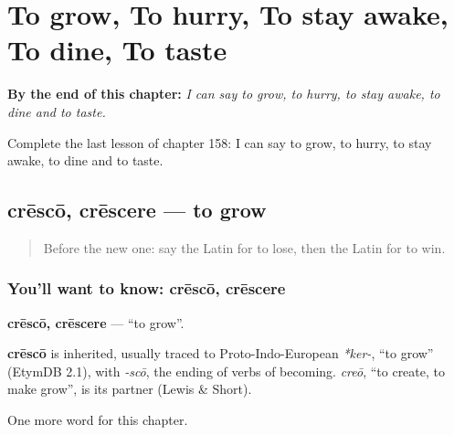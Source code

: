 
\chapter{To grow, To hurry, To stay awake, To dine, To taste}
\label{ch:la-to-grow-to-hurry-to-stay-awake-to-dine-to-taste}

\begin{chapteropening}
\textbf{By the end of this chapter:} \emph{I can say to grow, to hurry, to stay awake, to dine and to taste.}

Complete the last lesson of chapter 158: I can say to grow, to hurry, to stay awake, to dine and to taste.
\end{chapteropening}

\section[crēscō, crēscere]{crēscō, crēscere — to grow}

\label{lesson:LA-C158-cresco}



\begin{quote}
Before the new one: say the Latin for to lose, then the Latin for to win.
\end{quote}

\subsection*{You'll want to know: crēscō, crēscere}
\textbf{crēscō, crēscere} — \textquotedblleft{}to grow\textquotedblright{}.

\begin{cousinweb}
\textbf{crēscō} is inherited, usually traced to Proto-Indo-European \emph{*ker-}, \textquotedblleft{}to grow\textquotedblright{} (EtymDB 2.1), with \emph{-scō}, the ending of verbs of becoming. \emph{creō}, \textquotedblleft{}to create, to make grow\textquotedblright{}, is its partner (Lewis \& Short).
\end{cousinweb}

\begin{grammarlens}[title={What you've built}]
One more word for this chapter.
\end{grammarlens}

